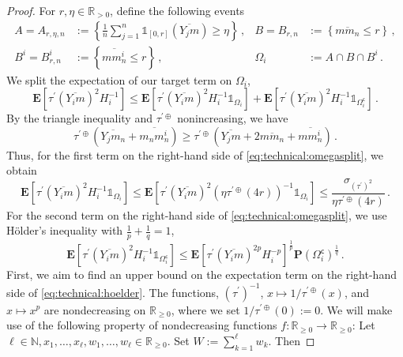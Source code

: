 \documentclass[10pt,a4paper]{amsart}
\newcommand{\E}{\mathbf{E}} %
\newcommand{\EOf}[1]{\E\abOf{#1}}
\newcommand{\N}{\mathbb{N}}
\renewcommand{\Pr}{\mathbf{P}} %
\newcommand{\PrOf}[1]{\Pr\brOf{#1}}
\newcommand{\R}{\mathbb{R}}
\newcommand{\Rp}{\R_{\geq0}}
\newcommand{\Rpp}{\R_{>0}}
\newcommand{\ab}[1]{\lab #1 \rab} %
\newcommand{\abOf}[1]{\!\ab{#1}} %
\newcommand{\br}[1]{\lb #1 \rb} %
\newcommand{\brOf}[1]{\!\br{#1}} %
\newcommand{\cb}[1]{\lcb #1 \rcb} %
\newcommand{\compl}{^\mathsf{c}}%
\newcommand{\ddrtran}{\tau^{\prime\oplus}}
\newcommand{\dtran}{\tau\pr}
\newcommand{\eqcm}{\,,} %
\newcommand{\eqfs}{\,.}
\newcommand{\ind}{\mathds{1}}%
\newcommand{\indOf}[1]{\ind_{\!#1}}%
\newcommand{\invdtran}{(\tau\pr)^{-1}}
\newcommand{\lab}{\left[} %
\newcommand{\lb}{\left(} %
\newcommand{\lcb}{\left\lbrace} %
\newcommand{\ol}[2]{\overline{#1#2}}
\newcommand{\pr}{^\prime}
\newcommand{\rab}{\right]} %
\newcommand{\rb}{\right)} %
\newcommand{\rcb}{\right\rbrace} %
\begin{document}
\begin{proof}
    For $r,\eta\in\Rpp$, define the following events
    \begin{align}
        A = A_{r,\eta,n} &:= \cb{\frac1n \sum_{j=1}^n \ind_{[0, r]}(\ol {Y_j}{m}) \geq \eta}
        \eqcm
        &
        B = B_{r,n} &:= \cb{\ol m{m_n} \leq r}
        \eqcm
        \\
        B^i = B^i_{r,n} &:= \cb{\ol m{m_n^i} \leq r}
        \eqcm
        &
        \Omega_i &:= A \cap B \cap B^i
        \eqfs
    \end{align}
    We split the expectation of our target term on $\Omega_i$,
    \begin{equation}\label{eq:technical:omegasplit}
        \EOf{\dtran(\ol{Y_i}m)^2 H_i^{-1}}
        \leq
        \EOf{\dtran(\ol{Y_i}m)^2 H_i^{-1} \indOf{\Omega_i}}
        +
        \EOf{\dtran(\ol{Y_i}m)^2 H_i^{-1} \indOf{\Omega_i\compl}}
        \eqfs
    \end{equation}
    By the triangle inequality and $\ddrtran$ nonincreasing, we have
    \begin{equation}
        \ddrtran(\ol{Y_j}{m_n}+\ol{m_n}{m_n^i}) \geq \ddrtran(\ol{Y_j}{m}+2\ol{m}{m_n}+\ol{m}{m_n^i})
        \eqfs
    \end{equation}
    Thus, for the first term on the right-hand side of \eqref{eq:technical:omegasplit}, we obtain
    \begin{equation}
        \EOf{\dtran(\ol{Y_i}m)^2 H_i^{-1} \indOf{\Omega_i}}
        \leq
        \EOf{\dtran(\ol{Y_i}m)^2 \br{\eta \ddrtran(4r)}^{-1} \indOf{\Omega_i}}
        \leq
        \frac{\sigma_{(\dtran)^2}}{\eta \ddrtran(4r)}
        \eqfs
    \end{equation}
    For the second term on the right-hand side of \eqref{eq:technical:omegasplit}, we use H\"older's inequality with $\frac1p + \frac1q = 1$,
    \begin{equation}\label{eq:technical:hoelder}
        \EOf{\dtran(\ol{Y_i}m)^2 H_i^{-1} \indOf{\Omega_i\compl}}
        \leq
        \EOf{\dtran(\ol{Y_i}m)^{2p} H_i^{-p}}^{\frac1p} \PrOf{\Omega_i\compl}^{\frac1q}
        \eqfs
    \end{equation}
    First, we aim to find an upper bound on the expectation term on the right-hand side of \eqref{eq:technical:hoelder}.
    The functions, $\invdtran$, $x\mapsto 1/\ddrtran(x)$, and $x\mapsto x^p$ are nondecreasing on $\Rp$, where we set $1/\ddrtran(0) := 0$.
    We will make use of the following property of nondecreasing functions $f \colon \Rp\to\Rp$: Let $\ell\in\N, x_1, \dots, x_\ell, w_1, \dots, w_\ell \in \Rp$. Set $W := \sum_{k=1}^\ell w_k$. Then

\end{proof}
\end{document}
